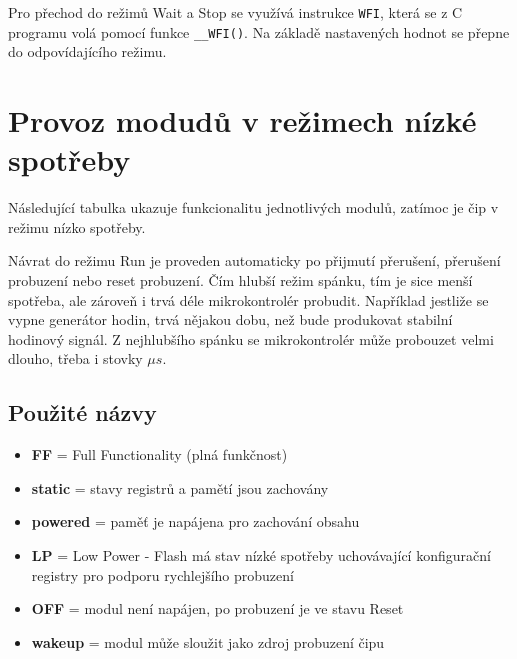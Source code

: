 \documentclass{article}
\begin{document}
Pro přechod do režimů Wait a Stop se využívá instrukce \texttt{WFI}, která se z
C programu volá pomocí funkce \texttt{\_\_WFI()}. Na základě nastavených hodnot
se přepne do odpovídajícího režimu.

\newpage
\section{Provoz modudů v režimech nízké spotřeby}

Následující tabulka ukazuje funkcionalitu jednotlivých modulů, zatímoc je čip
v režimu nízko spotřeby.

Návrat do režimu Run je proveden automaticky po přijmutí přerušení, přerušení
probuzení nebo reset probuzení. Čím hlubší režim spánku, tím je sice menší
spotřeba, ale zároveň i trvá déle mikrokontrolér probudit. Například jestliže
se vypne generátor hodin, trvá nějakou dobu, než bude produkovat stabilní
hodinový signál. Z nejhlubšího spánku se mikrokontrolér může probouzet velmi
dlouho, třeba i stovky \(\mu s\).

\subsection*{Použité názvy}
\begin{itemize}
    \item \textbf{FF} = Full Functionality (plná funkčnost)
    \item \textbf{static} = stavy registrů a pamětí jsou zachovány
    \item \textbf{powered} = paměť je napájena pro zachování obsahu
    \item \textbf{LP} = Low Power - Flash má stav nízké spotřeby uchovávající
        konfigurační registry pro podporu rychlejšího probuzení
    \item \textbf{OFF} = modul není napájen, po probuzení je ve stavu Reset
    \item \textbf{wakeup} = modul může sloužit jako zdroj probuzení čipu
\end{itemize}
\end{document}
